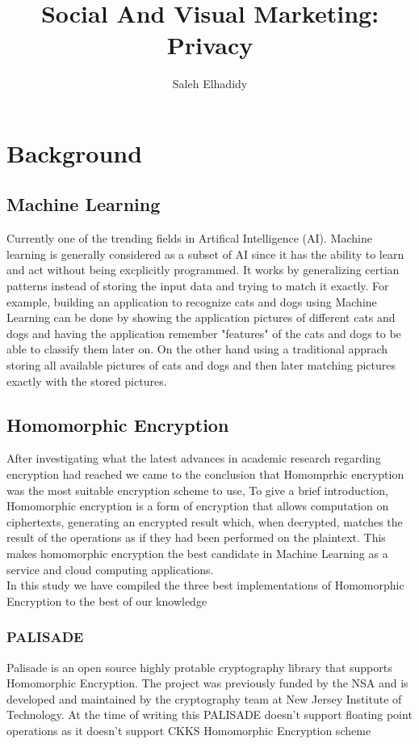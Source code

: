 \documentclass[10pt]{article}
\begin{document}
\title{Social And Visual Marketing: Privacy}
\author{Saleh Elhadidy}
\maketitle
\newpage
\tableofcontents
\newpage
\section{Background}
\subsection{Machine Learning}
Currently one of the trending fields in Artifical Intelligence (AI). Machine learning is generally considered as a subset of AI since it has the ability to learn and act without being
excplicitly programmed. It works by generalizing certian patterns instead of storing the input data and trying to match it exactly\cite{Intro}. For example, building an application to recognize
cats and dogs using Machine Learning can be done by showing the application pictures of different cats and dogs and having the application remember "features" of the cats and dogs to be
able to classify them later on. On the other hand using a traditional apprach storing all available pictures of cats and dogs and then later matching pictures exactly with the stored pictures.
\subsection{Homomorphic Encryption}
After investigating what the latest advances in academic research regarding encryption had reached we came to the conclusion that Homomprhic encryption was the most suitable encryption scheme to use,
To give a brief introduction, Homomorphic encryption is a form of encryption that allows computation on ciphertexts, generating an encrypted result which, when decrypted, matches the result of the operations as if they had been performed on the plaintext.
This makes homomorphic encryption the best candidate in Machine Learning as a service and cloud computing applications.\\
In this study we have compiled the three best implementations of Homomorphic Encryption to the best of our knowledge
\subsubsection{PALISADE}
Palisade is an open source highly protable cryptography library that supports Homomorphic Encryption. The project was previously funded by the NSA and is developed and maintained by the cryptography
team at New Jersey Institute of Technology. At the time of writing this PALISADE doesn't support floating point operations as it doesn't support CKKS Homomorphic Encryption scheme
\end{document}
